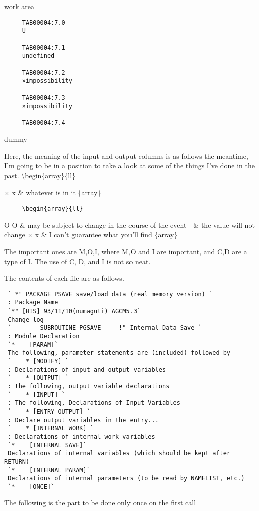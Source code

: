 work area

\begin{verbatim}
   - TAB00004:7.0 
     U
 
   - TAB00004:7.1 
     undefined
 
   - TAB00004:7.2 
     ×impossibility
 
   - TAB00004:7.3 
     ×impossibility
 
   - TAB00004:7.4 
\end{verbatim}

dummy

Here, the meaning of the input and output columns is as follows \In the
meantime, I'm going to be in a position to take a look at some of the
things I've done in the past. \textbackslash begin\{array\}\{ll\}

× x \& whatever is in it \{array\}

\begin{verbatim}
     \begin{array}{ll}   
\end{verbatim}

O O \& may be subject to change in the course of the event - \& the
value will not change × x \& I can't guarantee what you'll find
\{array\}

The important ones are M,O,I, where M,O and I are important, and C,D are
a type of I. The use of C, D, and I is not so neat.

The contents of each file are as follows.

\begin{verbatim}
 ` *" PACKAGE PSAVE save/load data (real memory version) ` 
 :̄ Package Name 
 `*" [HIS] 93/11/10(numaguti) AGCM5.3` 
 Change log 
 `        SUBROUTINE PGSAVE     !" Internal Data Save ` 
 : Module Declaration 
 `*    [PARAM]` 
 The following, parameter statements are (included) followed by 
 `    * [MODIFY] ` 
 : Declarations of input and output variables 
 `    * [OUTPUT] ` 
 : the following, output variable declarations 
 `    * [INPUT] ` 
 : The following, Declarations of Input Variables 
 `    * [ENTRY OUTPUT] ` 
 : Declare output variables in the entry... 
 `    * [INTERNAL WORK] ` 
 : Declarations of internal work variables 
 `*    [INTERNAL SAVE]` 
 Declarations of internal variables (which should be kept after RETURN) 
 `*    [INTERNAL PARAM]` 
 Declarations of internal parameters (to be read by NAMELIST, etc.) 
 `*    [ONCE]` 
\end{verbatim}

The following is the part to be done only once on the first call


